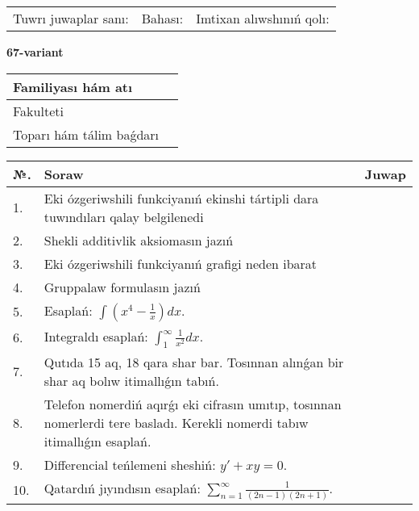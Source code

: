 \documentclass{article}
\begin{document}
\vspace{1cm}

\begin{tabular}{ c c c }
Tuwrı juwaplar sanı: \underline{\hspace{2cm}} & Bahası: \underline{\hspace{2cm}} & Imtixan alıwshınıń qolı: \underline{\hspace{2cm}} \\
\end{tabular}

\newpage

\begin{center}\textbf{67-variant}\end{center}

\bgroup
\def\arraystretch{1.5}
\begin{tabular}{ |m{6cm}|m{10cm}| }
  \hline
  Familiyası hám atı & \\
  \hline
  Fakulteti &\\
  \hline
  Toparı hám tálim baǵdarı & \\
  \hline
\end{tabular}
\egroup

\vspace{0.5cm}

\bgroup
\def\arraystretch{2}
\begin{tabular}{ |l|m{8cm}|m{7cm}| }
  \hline
  №. & Soraw & Juwap \\
  \hline
  1. & Eki ózgeriwshili funkciyanıń ekinshi tártipli dara tuwındıları qalay belgilenedi &  \\
  \hline
  2. & Shekli additivlik aksiomasın jazıń &  \\
  \hline
  3. & Eki ózgeriwshili funkciyanıń grafigi neden ibarat &  \\
  \hline
  4. & Gruppalaw formulasın jazıń &  \\
  \hline
  5. & Esaplań: $\displaystyle\int \left( x^{4}-\frac{1}{x} \right)dx$. &  \\
  \hline
  6. & Integraldı esaplań: $\displaystyle\int_{1}^{\infty}{\frac{1}{x^{2}}dx}$. &  \\
  \hline
  7. & Qutıda 15 aq, 18 qara shar bar. Tosınnan alınǵan bir shar aq bolıw itimallıǵın tabıń. &  \\
  \hline
  8. & Telefon nomerdiń aqırǵı eki cifrasın umıtıp, tosınnan nomerlerdi tere basladı. Kerekli nomerdi tabıw itimallıǵın esaplań. &  \\
  \hline
  9. & Differencial teńlemeni sheshiń: $y' + xy = 0$. &  \\
  \hline
  10. & Qatardıń jıyındısın esaplań: $\displaystyle\sum_{n = 1}^{\infty}\frac{1}{(2n - 1)(2n + 1)}$. &  \\
  \hline
\end{tabular}
\egroup
\end{document}
